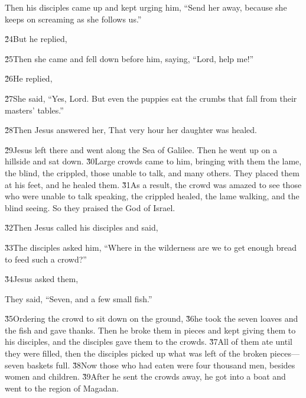 Then his disciples came up and kept urging him, ``Send her away, because she keeps on screaming as she follows us.''

\v{24}But he replied, 

\v{25}Then she came and fell down before him, saying, ``Lord, help me!''

\v{26}He replied, 

\v{27}She said, ``Yes, Lord. But even the puppies eat the crumbs that fall from their masters' tables.''

\v{28}Then Jesus answered her,  That very hour her daughter was healed.

\v{29}Jesus left there and went along the Sea of Galilee. Then he went up on a hillside and sat down. \v{30}Large crowds came to him, bringing with them the lame, the blind, the crippled, those unable to talk, and many others. They placed them at his feet, and he healed them. \v{31}As a result, the crowd was amazed to see those who were unable to talk speaking, the crippled healed, the lame walking, and the blind seeing. So they praised the God of Israel.

\v{32}Then Jesus called his disciples and said, 

\v{33}The disciples asked him, ``Where in the wilderness are we to get enough bread to feed such a crowd?''

\v{34}Jesus asked them, 

They said, ``Seven, and a few small fish.''

\v{35}Ordering the crowd to sit down on the ground, \v{36}he took the seven loaves and the fish and gave thanks. Then he broke them in pieces and kept giving them to his disciples, and the disciples gave them to the crowds. \v{37}All of them ate until they were filled, then the disciples picked up what was left of the broken pieces---seven baskets full. \v{38}Now those who had eaten were four thousand men, besides women and children. \v{39}After he sent the crowds away, he got into a boat and went to the region of Magadan.

